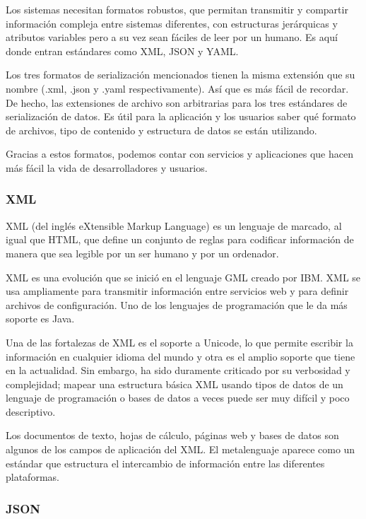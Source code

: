 Los sistemas necesitan formatos robustos, que permitan transmitir y compartir información compleja entre sistemas diferentes, con estructuras jerárquicas y atributos variables pero a su vez sean fáciles de leer por un humano. Es aquí donde entran estándares como XML, JSON y YAML.

Los tres formatos de serialización mencionados tienen la misma extensión que su nombre (.xml, .json y .yaml respectivamente). Así que es más fácil de recordar. De hecho, las extensiones de archivo son arbitrarias para los tres estándares de serialización de datos. Es útil para la aplicación y los usuarios saber qué formato de archivos, tipo de contenido y estructura de datos se están utilizando.

Gracias a estos formatos, podemos contar con servicios y aplicaciones que hacen más fácil la vida de desarrolladores y usuarios.

\subsubsection{XML}

XML (del inglés eXtensible Markup Language) es un lenguaje de marcado, al igual que HTML, que define un conjunto de reglas para codificar información de manera que sea legible por un ser humano y por un ordenador.

XML es una evolución que se inició en el lenguaje GML creado por IBM. XML se usa ampliamente para transmitir información entre servicios web y para definir archivos de configuración. Uno de los lenguajes de programación que le da más soporte es Java.

Una de las fortalezas de XML es el soporte a Unicode, lo que permite escribir la información en cualquier idioma del mundo y otra es el amplio soporte que tiene en la actualidad. Sin embargo, ha sido duramente criticado por su verbosidad y complejidad; mapear una estructura básica XML usando tipos de datos de un lenguaje de programación o bases de datos a veces puede ser muy difícil y poco descriptivo.

Los documentos de texto, hojas de cálculo, páginas web y bases de datos son algunos de los campos de aplicación del XML. El metalenguaje aparece como un estándar que estructura el intercambio de información entre las diferentes plataformas.

\subsubsection{JSON}

